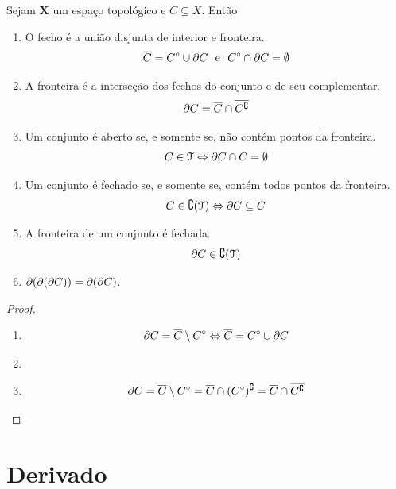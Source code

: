 \begin{prop}
	Sejam $\bm X$ um espaço topológico e $C \subseteq X$. Então
	\begin{enumerate}
	\item O fecho é a união disjunta de interior e fronteira.
	\begin{equation*}
	\overline{C} = {C}^\circ \cup \partial C \text{\ \ e\ \ } {C}^\circ \cap \partial C = \emptyset
	\end{equation*}
	\item A fronteira é a interseção dos fechos do conjunto e de seu complementar.
	\begin{equation*}
	\partial C = \overline{C} \cap \overline{C^\complement}
	\end{equation*}
	\item Um conjunto é aberto se, e somente se, não contém pontos da fronteira.
	\begin{equation*}
	C \in \mathcal{T} \Leftrightarrow \partial C \cap C = \emptyset
	\end{equation*}
	\item Um conjunto é fechado se, e somente se, contém todos pontos da fronteira.
	\begin{equation*}
	C \in \complement(\mathcal{T}) \Leftrightarrow \partial C \subseteq C
	\end{equation*}
	\item A fronteira de um conjunto é fechada.
	\begin{equation*}
	\partial C \in \complement(\mathcal{T})
	\end{equation*}
	\item $\partial (\partial (\partial C)) = \partial (\partial C)$.
	\end{enumerate}
\end{prop}
\begin{proof}
	\begin{enumerate}
	\item
	\begin{equation*}
	\partial C = \overline{C} \setminus {C}^\circ \Leftrightarrow \overline{C} = {C}^\circ \cup \partial C
	\end{equation*}
	\item
	\item 
	\begin{equation*}
	\partial C = \overline{C} \setminus {C}^\circ = \overline{C} \cap ({C}^\circ)^\complement = \overline{C} \cap \overline{C^\complement}
	\end{equation*}
	\end{enumerate}
\end{proof}

\section{Derivado}

